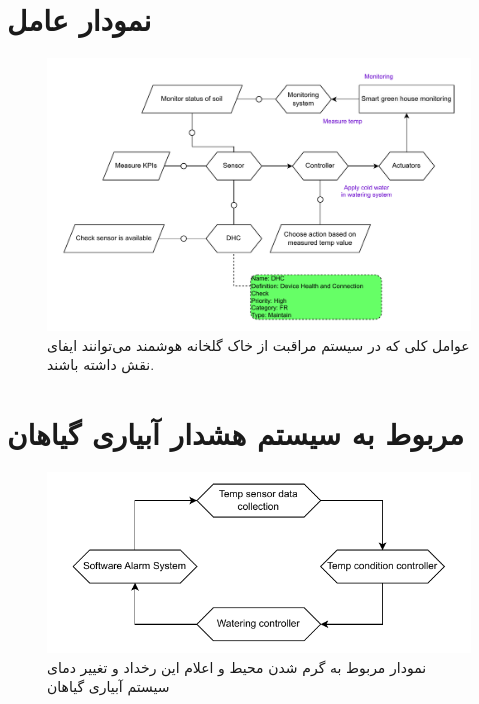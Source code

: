 \documentclass[a4paper]{report}
\begin{document}
\section*{نمودار عامل}

\begin{figure}[H]
    \centering
    \includegraphics[width=1.0\textwidth]{assets/diagrams/agent_diagram.drawio.pdf}
    \caption{عوامل کلی که در سیستم مراقبت از خاک گلخانه هوشمند می‌توانند ایفای
    نقش داشته باشند.}
\end{figure}

\section*{ مربوط به سیستم هشدار آبیاری گیاهان}

\begin{figure}[H]
    \centering
    \includegraphics[width=1.0\textwidth]{assets/diagrams/temp_context_diagram.drawio.pdf}
    \caption{نمودار  مربوط به گرم شدن محیط و اعلام این رخداد و تغییر
    دمای سیستم آبیاری گیاهان}
\end{figure}

\section*{}
\end{document}

